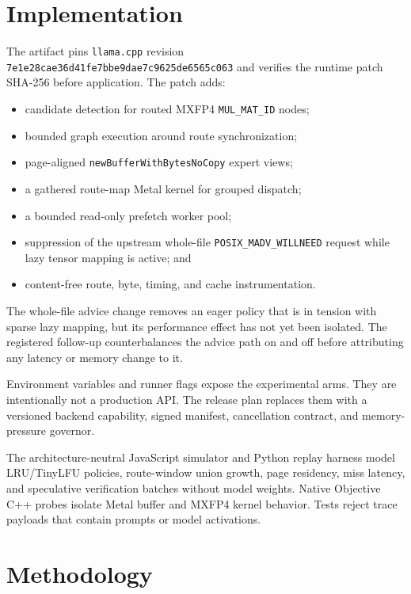 \documentclass[10pt,twocolumn]{article}
\begin{document}
\section{Implementation}

The artifact pins \texttt{llama.cpp} revision
\texttt{7e1e28cae36d41fe7bbe9dae7c9625de6565c063} and verifies the runtime
patch SHA-256 before application.  The patch adds:

\begin{itemize}[leftmargin=*]
  \item candidate detection for routed MXFP4 \texttt{MUL\_MAT\_ID} nodes;
  \item bounded graph execution around route synchronization;
  \item page-aligned \texttt{newBufferWithBytesNoCopy} expert views;
  \item a gathered route-map Metal kernel for grouped dispatch;
  \item a bounded read-only prefetch worker pool;
  \item suppression of the upstream whole-file
  \texttt{POSIX\_MADV\_WILLNEED} request while lazy tensor mapping is active;
  and
  \item content-free route, byte, timing, and cache instrumentation.
\end{itemize}

The whole-file advice change removes an eager policy that is in tension with
sparse lazy mapping, but its performance effect has not yet been isolated.
The registered follow-up counterbalances the advice path on and off before
attributing any latency or memory change to it.

Environment variables and runner flags expose the experimental arms.  They
are intentionally not a production API.  The release plan replaces them with
a versioned backend capability, signed manifest, cancellation contract, and
memory-pressure governor.

The architecture-neutral JavaScript simulator and Python replay harness model
LRU/TinyLFU policies, route-window union growth, page residency, miss latency,
and speculative verification batches without model weights.  Native Objective
C++ probes isolate Metal buffer and MXFP4 kernel behavior.  Tests reject trace
payloads that contain prompts or model activations.

\section{Methodology}
\end{document}
